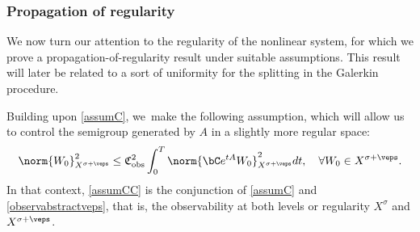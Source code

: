 \subsubsection{Propagation of regularity} We now turn our attention to the regularity of the nonlinear system, for which we prove a propagation-of-regularity result under suitable assumptions. This result will later be related to a sort of uniformity for the splitting in the Galerkin procedure.

Building upon \cref{assumC}, we~make the following assumption, which will allow us to control the semigroup generated by $A$ in a slightly more regular space:
\begin{align}\label{observabstractveps}
\norm{W_0}_{X^{\sigma+\veps}}^2\leq \mathfrak{C}_{\textup{obs}}^2\int_0^T \norm{\bC e^{tA}W_0}_{X^{\sigma+\veps}}^2dt,\quad \forall W_0\in X^{\sigma+\veps}.
\end{align}
In that context, \cref{assumCC} is the conjunction of \cref{assumC} and \eqref{observabstractveps}, that is, the observability at both levels or regularity $X^{\sigma}$ and $X^{\sigma+\veps}$.

